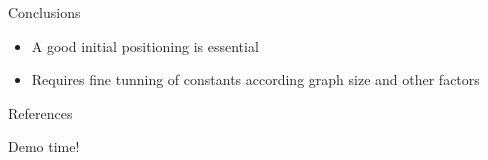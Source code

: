 \documentclass{beamer}
\begin{document}
\begin{frame}{Conclusions}
\begin{itemize}
\item A good initial positioning is essential
\item Requires fine tunning of constants according graph size and other factors %
\end{itemize}
\end{frame}

\nocite{*}

\begin{frame}{References}
  
  
\end{frame}

\begin{frame}
\begin{center}
\Huge{Demo time!}
\end{center}
\end{frame}
\end{document}
